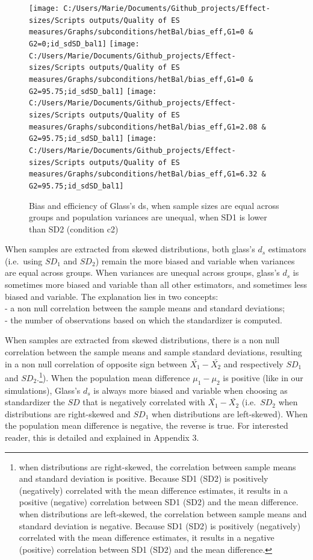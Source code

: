 \documentclass[
  man,floatsintext]{apa6}
\begin{document}
\begin{figure}

{\centering \texttt{[image: C:/Users/Marie/Documents/Github\_projects/Effect-sizes/Scripts outputs/Quality of ES measures/Graphs/subconditions/hetBal/bias\_eff,G1=0 \& G2=0;id\_sdSD\_bal1]} \texttt{[image: C:/Users/Marie/Documents/Github\_projects/Effect-sizes/Scripts outputs/Quality of ES measures/Graphs/subconditions/hetBal/bias\_eff,G1=0 \& G2=95.75;id\_sdSD\_bal1]} \texttt{[image: C:/Users/Marie/Documents/Github\_projects/Effect-sizes/Scripts outputs/Quality of ES measures/Graphs/subconditions/hetBal/bias\_eff,G1=2.08 \& G2=95.75;id\_sdSD\_bal1]} \texttt{[image: C:/Users/Marie/Documents/Github\_projects/Effect-sizes/Scripts outputs/Quality of ES measures/Graphs/subconditions/hetBal/bias\_eff,G1=6.32 \& G2=95.75;id\_sdSD\_bal1]} 

}

\caption{Bias and efficiency of Glass's ds, when sample sizes are equal across groups and population variances are unequal, when SD1 is lower than SD2 (condition c2)}\label{fig:idHetbal3}
\end{figure}

When samples are extracted from skewed distributions, both glass's \(d_s\) estimators (i.e.~using \(SD_1\) and \(SD_2\)) remain the more biased and variable when variances are equal across groups. When variances are unequal across groups, glass's \(d_s\) is sometimes more biased and variable than all other estimators, and sometimes less biased and variable. The explanation lies in two concepts:\\
- a non null correlation between the sample means and standard deviations;\\
- the number of observations based on which the standardizer is computed.

When samples are extracted from skewed distributions, there is a non null correlation between the sample means and sample standard deviations, resulting in a non null correlation of opposite sign between \(\bar{X_1}-\bar{X_2}\) and respectively \(SD_1\) and \(SD_2\).\footnote{when distributions are right-skewed, the correlation between sample means and standard deviation is positive. Because SD1 (SD2) is positively (negatively) correlated with the mean difference estimates, it results in a positive (negative) correlation between SD1 (SD2) and the mean difference. when distributions are left-skewed, the correlation between sample means and standard deviation is negative. Because SD1 (SD2) is positively (negatively) correlated with the mean difference estimates, it results in a negative (positive) correlation between SD1 (SD2) and the mean difference.}). When the population mean difference \(\mu_1-\mu_2\) is positive (like in our simulations), Glass's \(d_s\) is always more biased and variable when choosing as standardizer the \(SD\) that is negatively correlated with \(\bar{X_1}-\bar{X_2}\) (i.e.~\(SD_2\) when distributions are right-skewed and \(SD_1\) when distributions are left-skewed). When the population mean difference is negative, the reverse is true. For interested reader, this is detailed and explained in Appendix 3.
\end{document}
